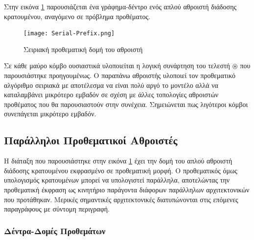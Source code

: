 Στην εικόνα \ref{Serial-PrefixTree} παρουσιάζεται ένα γράφημα-δέντρο ενός απλού αθροιστή διάδοσης κρατουμένου, αναγόμενο σε πρόβλημα προθέματος.\\ 
\begin{figure}[H]
\centering
\texttt{[image: Serial-Prefix.png]}
\caption{Σειριακή προθεματική δομή του αθροιστή}
\label{Serial-PrefixTree}
\end{figure}
Σε κάθε μαύρο κόμβο ουσιαστικά υλοποιείται η λογική συνάρτηση του τελεστή $\circledast$
που παρουσιάστηκε προηγουμένως. Ο παραπάνω αθροιστής υλοποιεί τον προθεματικό αλγόριθμο
σειριακά με αποτέλεσμα να είναι πολύ αργό το μοντέλο αλλά να καταλαμβάνει μικρότερο εμβαδόν
σε σχέση με άλλες τοπολογίες αθροιστών προθέματος που θα παρουσιαστούν στην συνέχεια. Σημειώνεται πως λιγότεροι κόμβοι συνεπάγεται μικρότερο εμβαδόν.












\subsection{Παράλληλοι Προθεματικοί Αθροιστές}
Η διάταξη που παρουσιάστηκε στην εικόνα \ref{Serial-PrefixTree} έχει την δομή 
του απλού αθροιστή διάδοσης κρατουμένου εκφρασμένο σε προθεματική μορφή. Ο προθεματικός
όμως υπολογισμός κρατουμένων μπορεί να υπολογιστεί παράλληλα, αποτελώντας την προθεματική 
έκφραση ως κινητήριο παράγοντα διάφορων παράλληλων αρχιτεκτονικών που προτάθηκαν.
Μερικές σημαντικές αρχιτεκτονικές διατυπώνονται στις επόμενες παραγράφους με σύντομη
περιγραφή.




\subsubsection{Δέντρα-Δομές Προθεμάτων}


